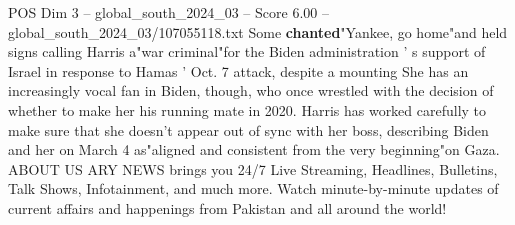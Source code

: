\begin{textsample}{POS Dim 3 – global\_south\_2024\_03 – Score 6.00 – global\_south\_2024\_03/107055118.txt}
Some \textbf{chanted}"Yankee, go home"and held signs calling Harris a"war criminal"for the Biden administration ' s support of Israel in response to Hamas ' Oct. 7 attack, despite a mounting She has an increasingly vocal fan in Biden, though, who once wrestled with the decision of whether to make her his running mate in 2020.
Harris has worked carefully to make sure that she doesn't appear out of sync with her boss, describing Biden and her on March 4 as"aligned and consistent from the very beginning"on Gaza.
ABOUT US ARY NEWS brings you 24/7 Live Streaming, Headlines, Bulletins, Talk Shows, Infotainment, and much more.
Watch minute-by-minute updates of current affairs and happenings from Pakistan and all around the world!

\end{textsample}
